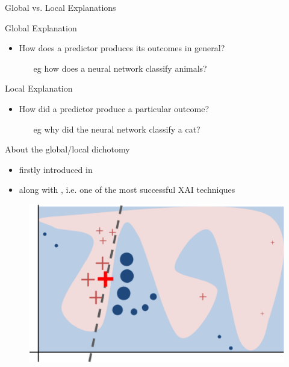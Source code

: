 \documentclass[presentation]{beamer}\mode<presentation>{\usetheme{AMSBolognaFC}}
\begin{document}
\begin{frame}[allowframebreaks]{Global vs. Local Explanations}
    \begin{block}{Global Explanation}
        \begin{itemize}
            \item How does a predictor produces its outcomes in general?
            \begin{itemize}
                \item[eg] how does a neural network classify animals?
            \end{itemize}
        \end{itemize}
    \end{block}

    \begin{block}{Local Explanation}
        \begin{itemize}
            \item How did a predictor produce a particular outcome?
            \begin{itemize}
                \item[eg] why did the neural network classify a cat?
            \end{itemize}
        \end{itemize}
    \end{block}

    \framebreak

    \begin{alertblock}{About the global/local dichotomy}
        \begin{itemize}
            \item firstly introduced in \cite{Ribeiro0G16}
            \item along with \lime{}, i.e. one of the most successful XAI techniques
        \end{itemize}
    \end{alertblock}

    \framebreak

    \begin{figure}
        \centering
        \includegraphics[width=.6\linewidth]{figures/lime.png}
        \caption{}
    \end{figure}
\end{frame}
\end{document}
